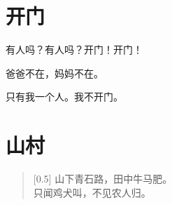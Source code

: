 \documentclass[12pt,UTF-8,openany]{ctexbook}
\begin{document}
\chapter{开门}

\begin{large}
    
    有人吗？有人吗？开门！开门！
    
    爸爸不在，妈妈不在。
    
    只有我一个人。我不开门。
    
\end{large}


\clearpage

\begin{center}
    
\end{center}


\hanzibox{}\hanzibox{}\hanzibox{}\hanzibox{}\hspace{1em}\hanzibox{}\hanzibox{}\hanzibox{}\hanzibox{}

\hanzibox{}\hanzibox{}\hanzibox{}\hanzibox{}\hspace{1em}\hanzibox{}\hanzibox{}\hanzibox{}\hanzibox{}

\hanzibox{}\hanzibox{}\hanzibox{}\hanzibox{}\hspace{1em}\hanzibox{}\hanzibox{}\hanzibox{}\hanzibox{}

\hanzibox{}\hanzibox{}\hanzibox{}\hanzibox{}\hspace{1em}\hanzibox{}\hanzibox{}\hanzibox{}\hanzibox{}






\chapter{山村}

\begin{large}
    
    \begin{verse}[0.5\linewidth]
        山下青石路，田中牛马肥。 \\
        只闻鸡犬叫，不见农人归。
    \end{verse}
    
\end{large}


\clearpage
\end{document}
